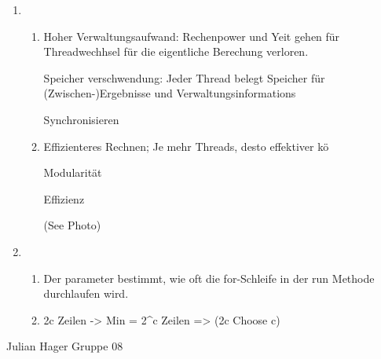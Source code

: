 \begin{enumerate}[label={T\arabic*},start=28]
	\item 
		\begin{enumerate}
			\item Hoher Verwaltungsaufwand: Rechenpower und Yeit gehen für Threadwechhsel für die eigentliche Berechung verloren.

			Speicher verschwendung: Jeder Thread belegt Speicher für (Zwischen-)Ergebnisse und Verwaltungsinformations

			Synchronisieren

			\item Effizienteres Rechnen; Je mehr Threads, desto effektiver kö

			Modularität

			Effizienz

			(See Photo)
		\end{enumerate}
	\item 
		\begin{enumerate}
			\item Der parameter bestimmt, wie oft die for-Schleife in der run Methode durchlaufen wird.
			\item 2c Zeilen -> Min = 2^c Zeilen => (2c Choose c)
		\end{enumerate}
\end{enumerate}

Julian Hager
Gruppe 08